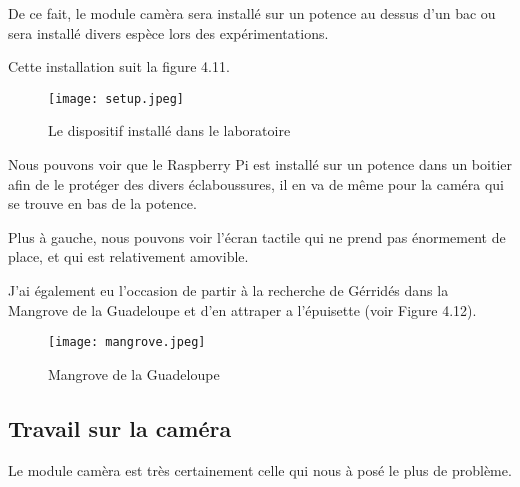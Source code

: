         \begin{flushleft}        
            De ce fait, le module camèra sera installé sur un potence au dessus d'un bac ou sera installé divers espèce lors des expérimentations.

            \vspace{0.2cm}

            Cette installation suit la figure 4.11.


            \begin{figure}[ht]
                \centering
                \texttt{[image: setup.jpeg]} 
                \caption{Le dispositif installé dans le laboratoire}
            \end{figure}

            Nous pouvons voir que le Raspberry Pi est installé sur un potence dans un boitier afin de le protéger des divers éclaboussures, il en va de même pour la caméra qui se trouve en bas de la potence.

            \vspace{0.2cm}

            Plus à gauche, nous pouvons voir l'écran tactile qui ne prend pas énormement de place, et qui est relativement amovible.

            \vspace{0.2cm}


    
            J'ai également eu l'occasion de partir à la recherche de Gérridés dans la Mangrove de la Guadeloupe et d'en attraper a l'épuisette (voir Figure 4.12).

            \begin{figure}[ht]
                \centering
                \texttt{[image: mangrove.jpeg]}
                \caption{Mangrove de la Guadeloupe}
            \end{figure}
            
        \end{flushleft}

        \subsection{Travail sur la caméra}
        Le module camèra est très certainement celle qui nous à posé le plus de problème.

